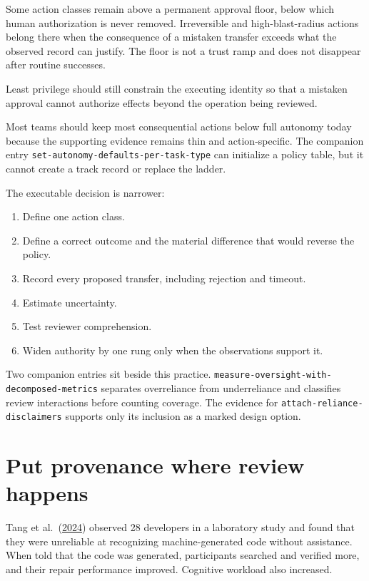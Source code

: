 Some action classes remain above a permanent approval floor, below which human authorization is never removed. Irreversible and high-blast-radius actions belong there when the consequence of a mistaken transfer exceeds what the observed record can justify. The floor is not a trust ramp and does not disappear after routine successes.

Least privilege should still constrain the executing identity so that a mistaken approval cannot authorize effects beyond the operation being reviewed.

Most teams should keep most consequential actions below full autonomy today because the supporting evidence remains thin and action-specific. The companion entry \texttt{set-autonomy-defaults-per-task-type} can initialize a policy table, but it cannot create a track record or replace the ladder.

The executable decision is narrower:

\begin{enumerate}
\def\labelenumi{\arabic{enumi}.}
\tightlist
\item
  Define one action class.
\item
  Define a correct outcome and the material difference that would reverse the policy.
\item
  Record every proposed transfer, including rejection and timeout.
\item
  Estimate uncertainty.
\item
  Test reviewer comprehension.
\item
  Widen authority by one rung only when the observations support it.
\end{enumerate}

Two companion entries sit beside this practice. \texttt{measure-oversight-with-decomposed-metrics} separates overreliance from underreliance and classifies review interactions before counting coverage. The evidence for \texttt{attach-reliance-disclaimers} supports only its inclusion as a marked design option.

\section{Put provenance where review happens}\label{put-provenance-where-review-happens}

Tang et al.~(\href{https://arxiv.org/abs/2405.16081}{2024}) observed 28 developers in a laboratory study and found that they were unreliable at recognizing machine-generated code without assistance. When told that the code was generated, participants searched and verified more, and their repair performance improved. Cognitive workload also increased.

